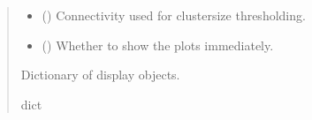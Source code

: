 \documentclass[letterpaper,10pt,english]{sphinxhowto}
\begin{document}
\begin{fulllineitems}
\begin{quote}
\begin{description}
\begin{itemize}
\item {} 
\sphinxAtStartPar
{} (\sphinxstyleliteralemphasis{\sphinxupquote{, }}) \textendash{} Connectivity used for cluster\sphinxhyphen{}size thresholding.

\item {} 
\sphinxAtStartPar
{} (\sphinxstyleliteralemphasis{\sphinxupquote{, }}) \textendash{} Whether to show the plots immediately.

\end{itemize}

\sphinxAtStartPar
{} \textendash{} Dictionary of display objects.

\sphinxAtStartPar
dict

\end{description}\end{quote}

\end{fulllineitems}

\end{document}
